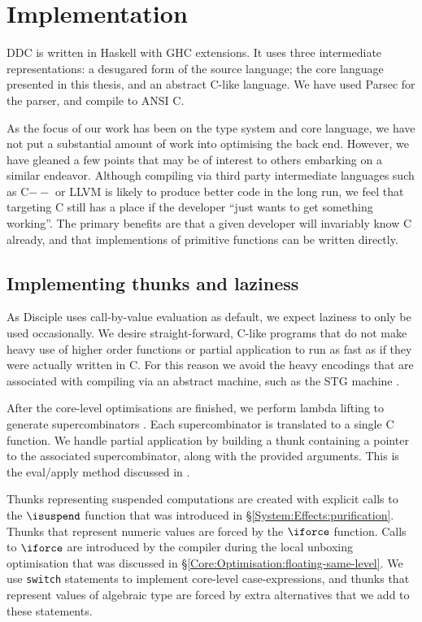 
\clearpage{}
\section{Implementation}

DDC is written in Haskell with GHC extensions. It uses three intermediate representations: a desugared form of the source language; the core language presented in this thesis, and an abstract C-like language. We have used Parsec \cite{leigen:parsec} for the parser, and compile to ANSI C.

As the focus of our work has been on the type system and core language, we have not put a substantial amount of work into optimising the back end. However, we have gleaned a few points that may be of interest to others embarking on a similar endeavor. Although compiling via third party intermediate languages such as C$- -$ \cite{peyton-jones:portable-assembly-language} or LLVM \cite{lattner:llvm} is likely to produce better code in the long run, we feel that targeting C still has a place if the developer ``just wants to get something working''. The primary benefits are that a given developer will invariably know C already, and that implementions of primitive functions can be written directly. 

\subsection{Implementing thunks and laziness}

As Disciple uses call-by-value evaluation as default, we expect laziness to only be used occasionally. We desire straight-forward, C-like programs that do not make heavy use of higher order functions or partial application to run as fast as if they were actually written in C. For this reason we avoid the heavy encodings that are associated with compiling via an abstract machine, such as the STG machine 
\cite{peyton-jones:g-machine}.

After the core-level optimisations are finished, we perform lambda lifting to generate supercombinators \cite{hughes:thesis}. Each supercombinator is translated to a single C function. We handle partial application by building a thunk containing a pointer to the associated supercombinator, along with the provided arguments. This is the eval/apply method discussed in \cite{marlow:fast-curry}.

Thunks representing suspended computations are created with explicit calls to the $\isuspend$ function that was introduced in \S\ref{System:Effects:purification}. Thunks that represent numeric values are forced by the $\iforce$ function. Calls to $\iforce$ are introduced by the compiler during the local unboxing optimisation that was discussed in \S\ref{Core:Optimisation:floating-same-level}. We use \texttt{switch} statements to implement core-level case-expressions, and thunks that represent values of algebraic type are forced by extra alternatives that we add to these statements.

